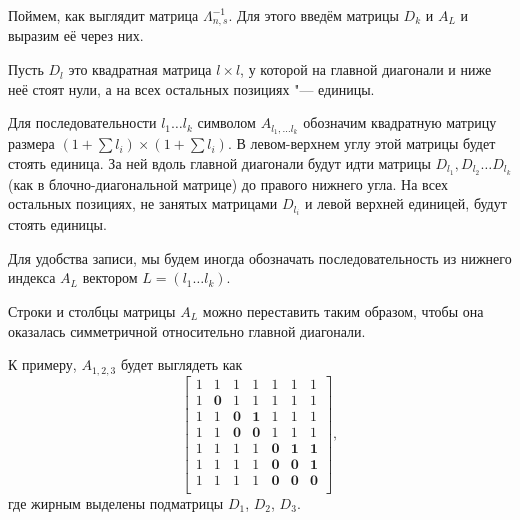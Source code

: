 \documentclass[a4paper, 14pt]{extarticle}
\begin{document}
Поймем, как выглядит матрица $\Lambda_{n, s}^{-1}$. Для этого введём матрицы
$D_k$ и $A_L$ и выразим её через них.

Пусть $D_l$ это квадратная матрица $l \times l$, у которой на главной диагонали и
ниже неё стоят нули, а на всех остальных позициях "--- единицы.

\begin{definition}
Для последовательности $l_1 \dots l_k$ символом $A_{l_1, \dots l_k}$ обозначим
квадратную матрицу размера $(1 + \sum l_i) \times (1 + \sum l_i)$. В левом-верхнем
углу этой матрицы будет стоять единица. За ней вдоль главной диагонали будут идти
матрицы $D_{l_1}, D_{l_2} \dots D_{l_k}$ (как в блочно-диагональной матрице) до
правого нижнего угла. На всех остальных позициях, не занятых матрицами $D_{l_i}$
и левой верхней единицей, будут стоять единицы.
\end{definition}

Для удобства записи, мы будем иногда обозначать последовательность из нижнего
индекса $A_L$ вектором $L = (l_1 \dots l_k)$.

\begin{remark}
Строки и столбцы матрицы $A_L$ можно переставить таким образом, чтобы она
оказалась симметричной относительно главной диагонали.
\end{remark}

К примеру, $A_{1, 2, 3}$ будет выглядеть как
\[
\begin{bmatrix}
1 & 1 & 1 & 1 & 1 & 1 & 1 \\
1 & \mathbf{0} & 1 & 1 & 1 & 1 & 1 \\
1 & 1 & \mathbf{0} & \mathbf{1} & 1 & 1 & 1 \\
1 & 1 & \mathbf{0} & \mathbf{0} & 1 & 1 & 1 \\
1 & 1 & 1 & 1 & \mathbf{0} & \mathbf{1} & \mathbf{1} \\
1 & 1 & 1 & 1 & \mathbf{0} & \mathbf{0} & \mathbf{1} \\
1 & 1 & 1 & 1 & \mathbf{0} & \mathbf{0} & \mathbf{0} \\
\end{bmatrix},
\]
где жирным выделены подматрицы $D_1$, $D_2$, $D_3$.
\end{document}
